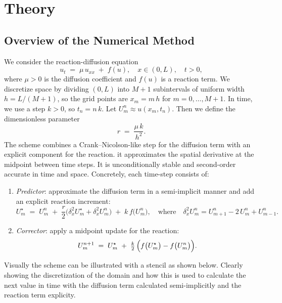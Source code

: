 \section{Theory}

\subsection{Overview of the Numerical Method}

We consider the reaction-diffusion equation
\[
  u_t \;=\; \mu\,u_{xx} \;+\; f(u),
  \quad x \in (0,L),\quad t>0,
\]
where \(\mu > 0\) is the diffusion coefficient and \(f(u)\) is a reaction term. We discretize
space by dividing \((0,L)\) into \(M+1\) subintervals of uniform width \(h = L/(M+1)\), so
the grid points are \(x_m = m\,h\) for \(m = 0,\dots,M+1\). In time, we use a step \(k>0\),
so \(t_n = n\,k\). Let \(U_m^n \approx u(x_m,t_n)\). Then we define the dimensionless
parameter
\[
  r \;=\; \frac{\mu\,k}{h^2}.
\]
The scheme combines a Crank–Nicolson-like step for the diffusion term with an explicit
component for the reaction. it approximates the spatial derivative at the midpoint between time steps.
It is unconditionally stable and second-order accurate in time and space. Concretely, each time-step consists of:

\begin{enumerate}
  \item \emph{Predictor}: approximate the diffusion term in a semi-implicit manner and
        add an explicit reaction increment:
        \[
          U_m^\star
          \;=\; U_m^n
          \;+\; \frac{r}{2}\bigl(\delta_x^2 U_m^\star + \delta_x^2 U_m^n\bigr)
          \;+\; k\,f\bigl(U_m^n\bigr), \quad \text{where} \quad \delta_x^2 U_m^n = U_{m+1}^n - 2\,U_m^n + U_{m-1}^n.
        \]


  \item \emph{Corrector}: apply a midpoint update for the reaction:
        \[
          U_m^{n+1}
          \;=\; U_m^\star
          \;+\; \tfrac{k}{2}\,\Bigl(f\bigl(U_m^\star\bigr) - f\bigl(U_m^n\bigr)\Bigr).
        \]
\end{enumerate}

Visually the scheme can be illustrated with a stencil as shown below. Clearly showing the discretization of
the domain and how this is used to calculate the next value in time with the diffusion term calculated
semi-implicitly and the reaction term explicity.


